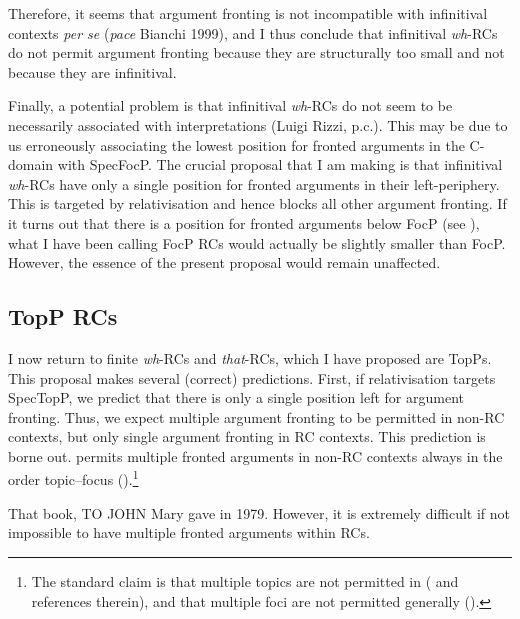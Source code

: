 \documentclass[output=paper]{langsci/langscibook}
\begin{document}
\ea\label{ex:key:2.82}
    \z
\z
Therefore, it seems that argument fronting is not incompatible with infinitival
contexts \emph{per se} (\emph{pace }Bianchi 1999), and I thus conclude that
infinitival \emph{wh}{-\glspl{RC} do not permit argument fronting because they are
structurally too small} and not because they are infinitival.

Finally, a potential problem is that infinitival \emph{wh}{-\glspl{RC} do not seem
to be necessarily associated with  interpretations (Luigi Rizzi, p.c.).}
This may be due to us erroneously associating the lowest position for fronted
arguments in the C-domain with SpecFocP\@. The crucial proposal that I am making
is that infinitival \emph{wh}{-\glspl{RC} have only a single} position for fronted
arguments in their left-periphery. This is targeted by relativisation and hence
blocks all other argument fronting. If it turns out that there is a position
for fronted arguments below FocP (see \citealt[83,
fn.\ 15]{Douglas2016}), what I have
been calling FocP \glspl{RC} would actually be slightly smaller than FocP\@. However,
the essence of the present proposal would remain unaffected.

\subsection{TopP RCs}\label{sec:key:02.4.4}

I now return to finite \emph{wh}{-\glspl{RC} and} \emph{that}{-RCs, which I have
proposed are TopPs.} This proposal makes several (correct) predictions. First,
if relativisation targets SpecTopP, we predict that there is only a single
position left for argument fronting. Thus, we expect multiple argument fronting
to be permitted in non-RC contexts, but only single argument fronting in RC
contexts. This prediction is borne out.  permits multiple fronted
arguments in non-RC contexts always in the order topic--focus
(\citealt{Culicover1991,Haegeman2012}).\footnote{The standard claim is that
multiple topics are not permitted in  (\citealt{Haegeman2012} and
references therein), and that multiple foci are not permitted generally
(\citealt{Haegeman2012,Rizzi1997}).}

\ea\label{ex:key:2.83}
    That book, TO JOHN Mary gave in 1979.
\z
However, it is extremely difficult if not impossible to have multiple fronted
arguments within \glspl{RC}.
\end{document}
